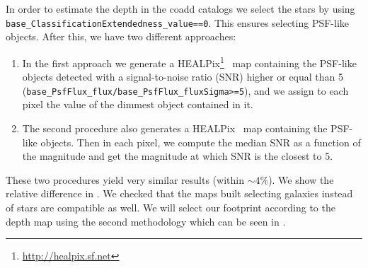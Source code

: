 \documentclass[\docopts]{\docclass}
\begin{document}
In order to estimate the depth in the coadd catalogs we select the stars by using \texttt{base\_ClassificationExtendedness\_value==0}. This ensures selecting
PSF-like objects. After this, we have two different approaches:

\begin{enumerate}
\item In the first approach we generate a HEALPix\footnote{\url{http://healpix.sf.net}}~\citep{2005ApJ...622..759G} map containing the PSF-like objects detected with a signal-to-noise ratio (SNR) higher or equal than 5 (\texttt{base\_PsfFlux\_flux/base\_PsfFlux\_fluxSigma>=5}), and we assign to each pixel the value of the
dimmest object contained in it.
\item The second procedure also generates a HEALPix~\citep{2005ApJ...622..759G} map containing the PSF-like objects. Then in each pixel, we compute the median SNR as a function of the magnitude and get the magnitude at which SNR is the closest to 5.
\end{enumerate}

These two procedures yield very similar results (within $\sim 4\%$). We show the relative difference in . We checked that the maps built selecting galaxies instead of stars are compatible as well. We will select our footprint according to the depth map using the second methodology which can be seen in .
\end{document}
